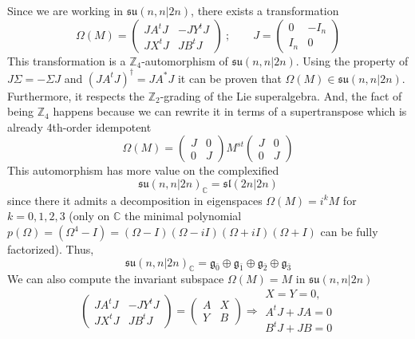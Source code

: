 \documentclass[a4paper,12pt]{article}
\numberwithin{equation}{section}
\numberwithin{thm}{section}
\numberwithin{exm}{section}
\newcommand{\Z}{{\mathbb Z}}
\newcommand{\C}{{\mathbb C}}
\newcommand{\<}{{\langle}}
\renewcommand{\>}{{\rangle}}
\newcommand{\mf}{\mathfrak}
\newcommand{\dg}{\dagger}
\newcommand{\Om}{{\Omega}}
\renewcommand{\S}{{\Sigma}}
\begin{document}
Since we are working in $\mf{su}(n,n|2n)$, there exists a transformation
	\begin{equation}
	\Om(M) = \left(
		\begin{array}{cc}
		J A^t J & - J Y^t J \\
		J X^t J & J B^t J
		\end{array}
	\right)\ ;\qquad J = \left(
		\begin{array}{cc}
		0 & - I_n \\
		I_n & 0
		\end{array}
	\right)
	\end{equation}
This transformation is a $\Z_4$-automorphism of $\mf{su}(n,n|2n)$. Using the property of $J\S = -\S J$ and $(JA^tJ)^\dg = JA^*J$ it can be proven that $\Om(M) \in \mf{su}(n,n|2n)$. Furthermore, it respects the $\Z_2$-grading of the Lie superalgebra. And, the fact of being $\Z_4$ happens because we can rewrite it in terms of a supertranspose which is already 4th-order idempotent
	\begin{equation}
	\Om(M) = \left(
		\begin{array}{cc}
		J & 0 \\
		0 & J
		\end{array}
	\right) M^{st} \left(
		\begin{array}{cc}
		J & 0 \\
		0 & J
		\end{array}
	\right)
	\end{equation}
This automorphism has more value on the complexified
	\begin{equation}
	\mf{su}(n,n|2n)_\C = \mf{sl}(2n|2n)
	\end{equation}
since there it admits a decomposition in eigenspaces $\Om(M) = i^k M$ for $k = 0,1,2,3$ (only on $\C$ the minimal polynomial $p(\Om) = (\Om^4-I) = (\Om - I)(\Om -iI)(\Om +iI)(\Om+I)$ can be fully factorized). Thus,
	\begin{equation}
	\mf{su}(n,n|2n)_\C = \mf g_{\bar 0}\oplus \mf g_{\bar 1}\oplus \mf g_{\bar 2}\oplus \mf g_{\bar 3}
	\end{equation}
We can also compute the invariant subspace $\Om(M) = M$ in $\mf{su}(n,n|2n)$
	\begin{equation}\label{symplec}
	\left(
		\begin{array}{cc}
		JA^tJ & - JY^tJ \\
		JX^tJ & JB^tJ
		\end{array}
	\right) = \left(
		\begin{array}{cc}
		A & X \\
		Y & B
		\end{array}
	\right) \Rightarrow
		\begin{array}{c}
		X = Y = 0, \\
		A^t J + J A = 0 \\
		B^t J + J B = 0
		\end{array}
	\end{equation}
\end{document}
